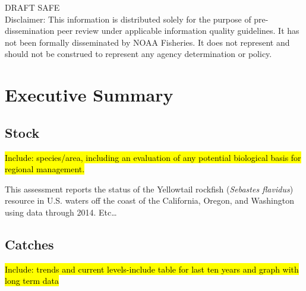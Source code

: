 \documentclass[12pt,]{article}
\begin{document}
\begin{center}
\vfill
DRAFT SAFE\\
Disclaimer: This information is distributed solely for the purpose of pre-dissemination
peer review under applicable information quality guidelines. It has not been formally
disseminated by NOAA Fisheries. It does not represent and should not be construed to
represent any agency determination or policy. 

\vspace{.3cm}

\maketitle

\setcounter{page}{1}
\end{center}

{
\setcounter{tocdepth}{4}
\tableofcontents
}
\setlength{\parskip}{5mm plus1mm minus1mm} \pagebreak

 \setcounter{page}{1}
\renewcommand{\thefigure}{\alph{figure}}
\renewcommand{\thetable}{\alph{table}}

\section*{Executive Summary}\label{executive-summary}

\subsection*{Stock}\label{stock}

\hl{Include: species/area, including an evaluation of any potential biological basis 
for regional management.}

This assessment reports the status of the Yellowtail rockfish
(\emph{Sebastes flavidus}) resource in U.S. waters off the coast of the
California, Oregon, and Washington using data through 2014. Etc\ldots{}

\subsection*{Catches}\label{catches}

\hl{Include: trends and current levels-include table for last ten years and graph with 
long term data}
\end{document}

